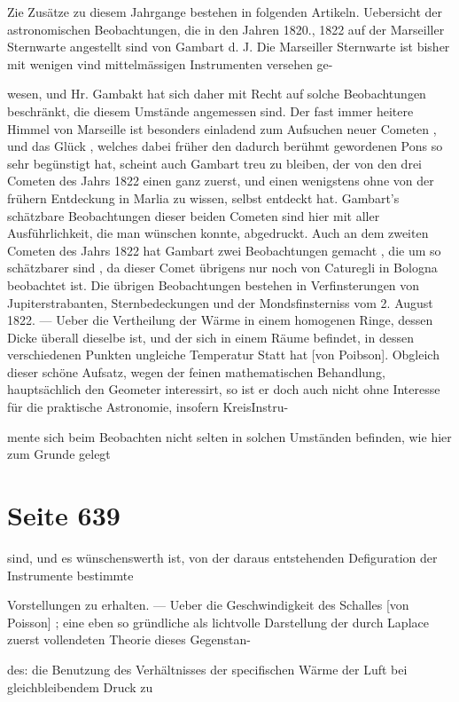 \documentclass[10pt,a4paper]{article}
\begin{document}
Zie Zusätze zu diesem Jahrgange bestehen in folgenden Artikeln. Uebersicht der astronomischen Beobachtungen, die in den Jahren 1820., 1822 auf der Marseiller Sternwarte angestellt sind von Gambart d. J. Die Marseiller Sternwarte ist bisher mit wenigen vind mittelmässigen Instrumenten versehen ge-

wesen, und Hr. Gambakt hat sich daher mit Recht auf solche Beobachtungen beschränkt, die diesem Umstände angemessen sind. Der fast immer heitere Himmel von Marseille ist besonders einladend zum Aufsuchen neuer Cometen , und das Glück , welches dabei früher den dadurch berühmt gewordenen Pons so sehr begünstigt hat, scheint auch Gambart treu zu bleiben, der von den drei Cometen des Jahrs 1822 einen ganz zuerst, und einen wenigstens ohne von der frühern Entdeckung in Marlia zu wissen, selbst entdeckt hat. Gambart's schätzbare Beobachtungen dieser beiden Cometen sind hier mit aller Ausführlichkeit, die man wünschen konnte, abgedruckt. Auch an dem zweiten Cometen des Jahrs 1822 hat Gambart zwei Beobachtungen gemacht , die um so schätzbarer sind , da dieser Comet übrigens nur noch von Caturegli in Bologna beobachtet ist. Die übrigen Beobachtungen bestehen in Verfinsterungen von Jupiterstrabanten, Sternbedeckungen und der Mondsfinsterniss vom 2. August 1822. — Ueber die Vertheilung der Wärme in einem homogenen Ringe, dessen Dicke überall dieselbe ist, und der sich in einem Räume befindet, in dessen verschiedenen Punkten ungleiche Temperatur Statt hat [von Poibson]. Obgleich dieser schöne Aufsatz, wegen der feinen mathematischen Behandlung, hauptsächlich den Geometer interessirt, so ist er doch auch nicht ohne Interesse für die praktische Astronomie, insofern KreisInstru-

mente sich beim Beobachten nicht selten in solchen Umständen befinden, wie hier zum Grunde gelegt


\newpage
\section*{Seite 639}
sind, und es wünschenswerth ist, von der daraus entstehenden Defiguration der Instrumente bestimmte

Vorstellungen zu erhalten. — Ueber die Geschwindigkeit des Schalles [von Poisson] ; eine eben so gründliche als lichtvolle Darstellung der durch Laplace zuerst vollendeten Theorie dieses Gegenstan-

des: die Benutzung des Verhältnisses der specifischen Wärme der Luft bei gleichbleibendem Druck zu
\end{document}
